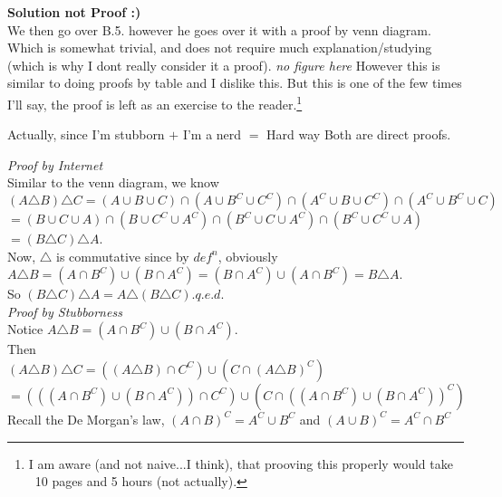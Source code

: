 \documentclass[12pt]{book}
\begin{document}
\noindent \textbf{Solution not Proof :)} \\
\indent We then go over B.5. however he goes over it with a proof by venn diagram. Which is somewhat trivial, and does not require much explanation/studying (which is why I dont really consider it a proof). \textit{no figure here}
However this is similar to doing proofs by table and I dislike this. But this is one of the few times I'll say, the proof is left as an exercise to the reader.\footnote{I am aware (and not naive...I think), that prooving this properly would take ~10 pages and 5 hours (not actually).}

Actually, since I'm stubborn $+$ I'm a nerd $=$ Hard way
Both are direct proofs.

\noindent \textit{Proof by Internet}\\
Similar to the venn diagram, we know\\
$(A \triangle B) \triangle C = (A \cup B \cup C) \cap (A \cup B^{C} \cup C^{C}) \cap (A^{C} \cup B \cup C^{C}) \cap (A^{C} \cup B^{C} \cup C)$\\
$= (B \cup C \cup A) \cap (B \cup C^{C} \cup A^{C}) \cap (B^{C} \cup C \cup A^{C}) \cap (B^{C} \cup C^{C} \cup A)$\\
$=(B \triangle C) \triangle A$.\\

Now, $\triangle$ is commutative since by $def^n$, obviously \\
$A\triangle B=(A\cap B^{C}) \cup (B \cap A^{C})= (B \cap A^{C}) \cup (A\cap B^{C}) = B\triangle A$.\\
\noindent So $(B \triangle C) \triangle A = A \triangle (B \triangle C)$.\hfill$q.e.d.$\\

\noindent \textit{Proof by Stubborness}\\
\noindent Notice $A\triangle B=(A\cap B^{C}) \cup (B \cap A^{C})$.\\

\noindent Then \\
$(A \triangle B) \triangle C = ((A \triangle B)\cap C^{C}) \cup (C \cap (A \triangle B)^{C})$\\
$=(((A\cap B^{C}) \cup (B \cap A^{C}))\cap C^{C}) \cup (C \cap ((A\cap B^{C}) \cup (B \cap A^{C}))^{C})$\\

\noindent Recall the De Morgan's law, $(A \cap B)^{C}= A^{C} \cup B^{C}$ and $(A \cup B)^{C}= A^{C} \cap B^{C}$\\
\end{document}
